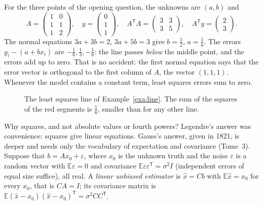 \begin{example}\label{exa:line}
For the three points of the opening question, the unknowns are $(a,b)$ and
\[
A=\begin{pmatrix}1&0\\1&1\\1&2\end{pmatrix},\quad y=\begin{pmatrix}0\\1\\1\end{pmatrix},\quad
A^{\mathsf T}A=\begin{pmatrix}3&3\\3&5\end{pmatrix},\quad A^{\mathsf T}y=\begin{pmatrix}2\\3\end{pmatrix}.
\]
The normal equations $3a+3b=2$, $3a+5b=3$ give $b=\frac12$, $a=\frac16$. The errors $y_i-(a+bx_i)$ are $-\frac16,\frac13,
-\frac16$: the line passes \emph{below} the middle point, and the errors add up to zero. That is no accident: the first
normal equation says that the error vector is orthogonal to the first column of $A$, the vector $(1,1,1)$. Whenever
the model contains a constant term, least squares errors sum to zero.
\end{example}

\begin{figure}[ht]
\centering
{}
\caption{The least squares line of Example~\ref{exa:line}. The sum of the squares of the red segments is $\frac16$,
smaller than for any other line.}
\label{fig:lsq}
\end{figure}

Why squares, and not absolute values or fourth powers? Legendre's answer was convenience: squares give linear equations.
Gauss's answer, given in 1821, is deeper and needs only the vocabulary of expectation and covariance (Tome~3). Suppose
that $b=Ax_0+\varepsilon$, where $x_0$ is the unknown truth and the noise $\varepsilon$ is a random vector with
$\mathbb E\varepsilon=0$ and covariance $\mathbb E\varepsilon\varepsilon^{\mathsf T}=\sigma^2I$ (independent errors of
equal size suffice), all real. A \emph{linear unbiased estimator} is $\hat x=Cb$ with $\mathbb E\hat x=x_0$ for every
$x_0$, that is $CA=I$; its covariance matrix is $\mathbb E(\hat x-x_0)(\hat x-x_0)^{\mathsf T}=\sigma^2CC^{\mathsf T}$.

